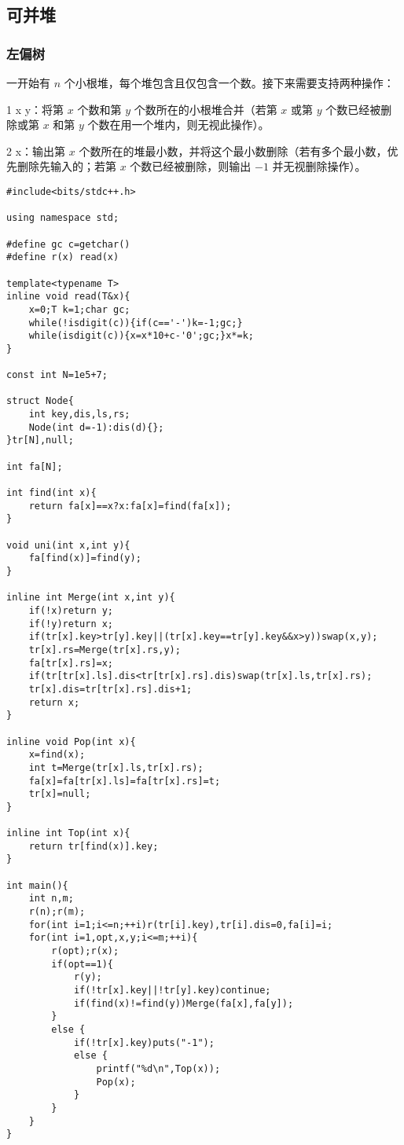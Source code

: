 \documentclass{ctexart}
\begin{document}
\subsection{可并堆}
\subsubsection{左偏树}
一开始有 $n$ 个小根堆，每个堆包含且仅包含一个数。接下来需要支持两种操作：

1 x y：将第 $x$ 个数和第 $y$ 个数所在的小根堆合并（若第 $x$ 或第 $y$ 个数已经被删除或第 $x$ 和第 $y$ 个数在用一个堆内，则无视此操作）。

2 x：输出第 $x$ 个数所在的堆最小数，并将这个最小数删除（若有多个最小数，优先删除先输入的；若第 $x$ 个数已经被删除，则输出 $-1$ 并无视删除操作）。

\begin{lstlisting}
#include<bits/stdc++.h>

using namespace std;

#define gc c=getchar()
#define r(x) read(x)

template<typename T>
inline void read(T&x){
    x=0;T k=1;char gc;
    while(!isdigit(c)){if(c=='-')k=-1;gc;}
    while(isdigit(c)){x=x*10+c-'0';gc;}x*=k;
}

const int N=1e5+7;

struct Node{
    int key,dis,ls,rs;
    Node(int d=-1):dis(d){};
}tr[N],null;

int fa[N];

int find(int x){
    return fa[x]==x?x:fa[x]=find(fa[x]);
}

void uni(int x,int y){
    fa[find(x)]=find(y);
}

inline int Merge(int x,int y){
    if(!x)return y;
    if(!y)return x;
    if(tr[x].key>tr[y].key||(tr[x].key==tr[y].key&&x>y))swap(x,y);
    tr[x].rs=Merge(tr[x].rs,y);
    fa[tr[x].rs]=x;
    if(tr[tr[x].ls].dis<tr[tr[x].rs].dis)swap(tr[x].ls,tr[x].rs);
    tr[x].dis=tr[tr[x].rs].dis+1;
    return x;
}

inline void Pop(int x){
    x=find(x);
    int t=Merge(tr[x].ls,tr[x].rs);
    fa[x]=fa[tr[x].ls]=fa[tr[x].rs]=t;
    tr[x]=null;
}

inline int Top(int x){
    return tr[find(x)].key;
}

int main(){
    int n,m;
    r(n);r(m);
    for(int i=1;i<=n;++i)r(tr[i].key),tr[i].dis=0,fa[i]=i;
    for(int i=1,opt,x,y;i<=m;++i){
        r(opt);r(x);
        if(opt==1){
            r(y);
            if(!tr[x].key||!tr[y].key)continue;
            if(find(x)!=find(y))Merge(fa[x],fa[y]);
        }
        else {
            if(!tr[x].key)puts("-1");
            else {
                printf("%d\n",Top(x));
                Pop(x);
            }
        }
    }
}
\end{lstlisting}
\end{document}
